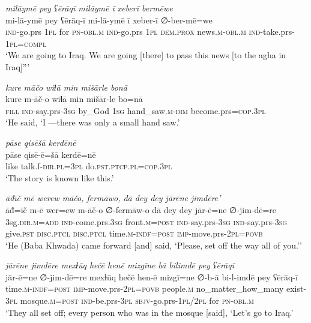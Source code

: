 \ea \label{BP.79}
\textit{milāymē pey ʕērāqī milāymē ī xeberī bermēwe} \\ 
\gll mi-lā-ymē pey ʕērāq-ī mi-lā-ymē ī xeber-ī ∅-ber-mē=we \\ 
 \textsc{ind-}go.prs \textsc{1pl} for \textsc{pn}\textsc{-obl}\textsc{.m} \textsc{ind-}go.prs \textsc{1pl} \textsc{dem.prox} news\textsc{.m}\textsc{-obl}\textsc{.m} \textsc{ind-}take.prs\textsc{-\textsc{1pl}}\textsc{=compl} \\ 
\glt `We are going to Iraq. We are going [there] to pass this news [to the agha in Iraq]”'
\z 
 
\ea \label{BP.82}
\textit{kure māčo wiɫā min mišārle bonā} \\ 
\gll kure m-āč-o wiɫā min mišār-le bo=nā \\ 
 \textsc{fill} \textsc{ind-}say.prs\textsc{-3sg} by\_God \textsc{1sg} hand\_saw\textsc{.m}\textsc{-dim} become.prs\textsc{=cop}\textsc{.3pl} \\ 
\glt `He said, ‘I —there was only a small hand saw.'
\z 
 
\ea \label{BP.85}
\textit{pāse qisēšā kerdēnē} \\ 
\gll pāse qisē-ē=šā kerdē=nē \\ 
 like talk.f\textsc{-dir}\textsc{.pl}\textsc{=3pl} do\textsc{.pst}\textsc{.ptcp}\textsc{.pl}\textsc{=cop}\textsc{.3pl} \\ 
\glt `The story is known like this.'
\z 
 
\ea \label{BP.86}
\textit{āđīč mē werew māčo, fermāwo, dā dey dey jārēne jimdēre’} \\ 
\gll āđ=īč m-ē wer=ew m-āč-o ∅-fermāw-o dā dey dey jār-ē=ne ∅-jim-dē=re \\ 
 3sg\textsc{.dir}\textsc{.m}\textsc{=add} \textsc{ind-}come.prs\textsc{.3sg} front\textsc{.m}\textsc{=\textsc{post}} \textsc{ind-}say.prs\textsc{-3sg} \textsc{ind-}say.prs\textsc{-3sg} give\textsc{.pst} \textsc{disc.ptcl} \textsc{disc.ptcl} time\textsc{.m}\textsc{-indf}\textsc{=\textsc{post}} \textsc{imp-}move.prs-\textsc{2pl}\textsc{=\textsc{povb}} \\ 
\glt `He (Baba Khwada) came forward [and] said, ‘Please, set off the way all of you.’'
\z 
 
\ea \label{BP.87}
\textit{jārēne jimdēre mexɫūq hečē henē mizgīne bā bilimdē pey ʕērāqī} \\ 
\gll jār-ē=ne ∅-jim-dē=re mexɫūq hečē hen-ē mizgī=ne ∅-b-ā bi-l-imdē pey ʕērāq-ī \\ 
 time\textsc{.m}\textsc{-indf}\textsc{=\textsc{post}} \textsc{imp-}move.prs-\textsc{2pl}\textsc{=\textsc{povb}} people\textsc{.m} no\_matter\_how\_many exist\textsc{-3pl} mosque\textsc{.m}\textsc{=\textsc{post}} \textsc{ind-}be.prs\textsc{-3pl} \textsc{sbjv-}go.prs\textsc{-\textsc{1pl}}/\textsc{2pl} for \textsc{pn}\textsc{-obl}\textsc{.m} \\ 
\glt `They all set off; every person who was in the mosque [said], ‘Let’s go to Iraq.'
\z 
 
